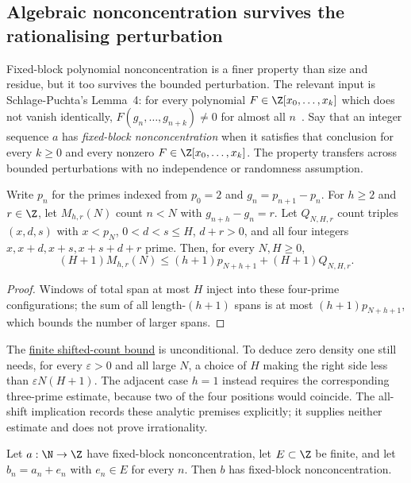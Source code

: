 \documentclass[11pt]{article}
\begin{document}
\subsection{Algebraic nonconcentration survives the rationalising perturbation}

Fixed-block polynomial nonconcentration is a finer property than size and
residue, but it too survives the bounded perturbation.  The relevant input
is Schlage-Puchta's Lemma~4: for every polynomial
$F\in\Z[x_0,\ldots,x_k]$ which does not vanish identically,
$F(g_n,\ldots,g_{n+k})\ne0$ for almost all $n$~\cite[Lemma~4,
pp.~5--6]{schlagepuchta2011}.  Say that an integer sequence $a$ has
\emph{fixed-block nonconcentration} when it satisfies that conclusion for
every $k\ge0$ and every nonzero $F\in\Z[x_0,\ldots,x_k]$.  The property
transfers across bounded perturbations with no independence or randomness
assumption.


\begin{proposition}\label{long251:res:shiftedcount}
Write $p_n$ for the primes indexed from $p_0=2$ and $g_n=p_{n+1}-p_n$.
For $h\ge2$ and $r\in\Z$, let $M_{h,r}(N)$ count $n<N$ with $g_{n+h}-g_n=r$.
Let $Q_{N,H,r}$ count triples $(x,d,s)$ with $x<p_N$,
$0<d<s\le H$, $d+r>0$, and all four integers
$x,x+d,x+s,x+s+d+r$ prime. Then, for every $N,H\ge0$,
\[
 (H+1)M_{h,r}(N)\le
 (h+1)p_{N+h+1}+(H+1)Q_{N,H,r}.
\]
\end{proposition}

\begin{proof}
Windows of total span at most $H$ inject into these four-prime
configurations; the sum of all length-$(h+1)$ spans is at most
$(h+1)p_{N+h+1}$, which bounds the number of larger spans.
\end{proof}

The \href{https://github.com/wcook04/plectis-erdos/blob/d058b9150218ae23d2cfd975580088d6167e9da8/ErdosProblems/Erdos251/ShiftedGapCountingR9.lean#L152}{finite shifted-count bound} is unconditional.
To deduce zero density one still needs, for every $\varepsilon>0$ and all
large $N$, a choice of $H$ making the right side less than
$\varepsilon N(H+1)$. The adjacent case $h=1$ instead requires the
corresponding three-prime estimate, because two of the four positions would
coincide. The all-shift implication records these analytic premises explicitly;
it supplies neither estimate and does not prove irrationality.

\begin{theorem}\label{long251:res:nonconcentration}
Let $a:\N\to\Z$ have fixed-block nonconcentration, let $E\subset\Z$ be finite,
and let $b_n=a_n+e_n$ with $e_n\in E$ for every $n$.  Then $b$ has fixed-block
nonconcentration.
\end{theorem}
\end{document}

